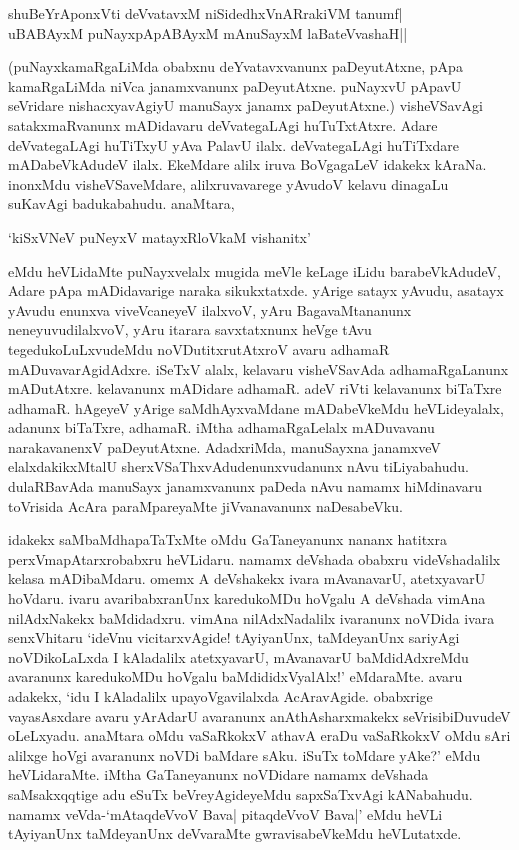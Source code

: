 \begin{shloka}
shuBeYrAponxVti deVvatavxM niSidedhxVnARrakiVM tanumf|\\
uBABAyxM puNayxpApABAyxM mAnuSayxM laBateV\s vashaH||
\end{shloka}

(puNayxkamaRgaLiMda obabxnu deYvatavxvanunx paDeyutAtxne, pApa kamaRgaLiMda niVca janamxvanunx paDeyutAtxne. puNayxvU pApavU seVridare nishacxyavAgiyU manuSayx janamx paDeyutAtxne.) visheVSavAgi satakxmaRvanunx mADidavaru deVvategaLAgi huTuTxtAtxre. Adare deVvategaLAgi huTiTxyU yAva PalavU ilalx. deVvategaLAgi huTiTxdare mADabeVkAdudeV ilalx. EkeMdare alilx iruva BoVgagaLeV idakekx kAraNa. inonxMdu visheVSaveMdare, alilxruvavarege yAvudoV kelavu dinagaLu suKavAgi badukabahudu. anaMtara,

\begin{shloka}
`kiSxVNeV puNeyxV matayxRloVkaM vishanitx'
\end{shloka}

eMdu heVLidaMte puNayxvelalx mugida meVle keLage iLidu barabeVkAdudeV, Adare pApa mADidavarige naraka sikukxtatxde. yArige satayx yAvudu, asatayx yAvudu enunxva viveVcaneyeV ilalxvoV, yAru BagavaMtananunx neneyuvudilalxvoV, yAru itarara savxtatxnunx heVge tAvu tegedukoLuLxvudeMdu noVDutitxrutAtxroV avaru adhamaR mADuvavarAgidAdxre. iSeTxV alalx, kelavaru visheVSavAda adhamaRgaLanunx mADutAtxre. kelavanunx mADidare adhamaR. adeV riVti kelavanunx biTaTxre adhamaR. hAgeyeV yArige saMdhAyxvaMdane mADabeVkeMdu heVLideyalalx, adanunx biTaTxre, adhamaR. iMtha adhamaRgaLelalx mADuvavanu narakavanenxV paDeyutAtxne. AdadxriMda, manuSayxna janamxveV elalxdakikxMtalU sherxVSaThxvAdudenunxvudanunx nAvu tiLiyabahudu. dulaRBavAda manuSayx janamxvanunx paDeda nAvu namamx hiMdinavaru toVrisida AcAra paraMpareyaMte jiVvanavanunx naDesabeVku.

idakekx saMbaMdhapaTaTxMte oMdu GaTaneyanunx nananx hatitxra perxVmapAtarxrobabxru heVLidaru. namamx deVshada obabxru videVshadalilx kelasa mADibaMdaru. omemx A deVshakekx ivara mAvanavarU, atetxyavarU hoVdaru. ivaru avaribabxranUnx karedukoMDu hoVgalu A deVshada vimAna nilAdxNakekx baMdidadxru. vimAna nilAdxNadalilx ivaranunx noVDida ivara senxVhitaru `ideVnu vicitarxvAgide! tAyiyanUnx, taMdeyanUnx sariyAgi noVDikoLaLxda I kAladalilx atetxyavarU, mAvanavarU baMdidAdxreMdu avaranunx karedukoMDu hoVgalu baMdididxVyalAlx!' eMdaraMte. avaru adakekx, `idu I kAladalilx upayoVgavilalxda AcAravAgide. obabxrige vayasAsxdare avaru yArAdarU avaranunx anAthAsharxmakekx seVrisibiDuvudeV oLeLxyadu. anaMtara oMdu vaSaRkokxV athavA eraDu vaSaRkokxV oMdu sAri alilxge hoVgi avaranunx noVDi baMdare sAku. iSuTx toMdare yAke?' eMdu heVLidaraMte. iMtha GaTaneyanunx noVDidare namamx deVshada saMsakxqqtige adu eSuTx beVreyAgideyeMdu sapxSaTxvAgi kANabahudu. namamx veVda-`mAtaqdeVvoV Bava| pitaqdeVvoV Bava|' eMdu heVLi tAyiyanUnx taMdeyanUnx deVvaraMte gwravisabeVkeMdu heVLutatxde.

